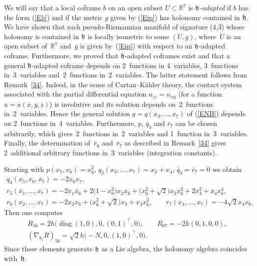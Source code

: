 \documentclass[11pt]{article}
\numberwithin{equation}{section}
\newcommand\fh{{\frak h}}
\newcommand\RR{{\mathbb R}}
\newcommand{\diag}{\operatorname{diag}}
\begin{document}
\begin{Remark} \label{R35} We will say that a local coframe $b$ on an open subset $U\subset \RR^7$ is {\it $\fh$-adapted} if $b$ has the form (\ref{Eb}) and if the metric $g$ given by (\ref{Eip}) has holonomy contained in $\fh$. We have shown that each pseudo-Riemannian manifold of signature (4,3) whose holonomy is contained in $\fh$ is locally isometric to some $(U,g)$, where~$U$ is an open subset of~$\RR^7$ and~$g$ is given by~(\ref{Eip}) with respect to an $\fh$-adapted coframe. Furthermore, we proved that $\fh$-adapted coframes exist and that a general $\fh$-adapted coframe depends on 2~functions in 4~variables, 3~functions in~3~variables and~2~functions in~2~variables. The latter statement follows from Remark~\ref{34}. Indeed, in the sense of Cartan--K\"ahler theory, the contact system associated with the partial differential equation $u_{zz}=u_{xy}$ (for a function $u=u(x,y,z)$) is involutive and its solution depends on~2~functions in~2~variables. Hence the general solution $q=q(x_3,\dots,x_7)$ of (\ref{ENB}) depends on 2~functions in~4~variables. Furthermore, $p$, $\bar q_3$ and $\bar r_7$ can be chosen arbitrarily, which gives~2~functions in~2~variables and 1~function in~3~variables. Finally, the determination of~$\bar r_6$ and~$\bar r_7$ as described in Remark~\ref{34} gives 2~additional arbitrary functions in~3~variables (integration constants).
\end{Remark}

\begin{Example} Starting with $p(x_5,x_6)=x_6^2$, $q_2(x_3,\dots, x_7)=x_3+x_4$, $\bar q_3=\bar r_7=0$ we obtain
\begin{gather*}
q_3(x_5,x_6,x_7) = -2x_6 x_7 ,\\
r_5(x_1,\dots, x_7) = -2x_1 x_6 +2 \big(1-x_6^2\big) x_2 x_6 +\big(x_6^2 +\sqrt2\big)x_3 x_6^2 +2x_4^2 +x_4 x_6^4,\\
r_6(x_2,\dots, x_7) = -2x_2 x_6 +\big(x_6^2 +\sqrt2\big)x_3 +x_4 x_6^2,\qquad
r_7(x_4,\dots, x_7) = -4\sqrt 2x_4 x_6 .
\end{gather*}
Then one computes
\begin{gather*}R_{56}=2h\big(\diag(1,0),0,(0,1)^\top,0\big), \qquad R_{67}=-2h(0,1,0,0), \\ (\nabla_{b_5} R)_{56}=\sqrt2 h\big({-}N,0,(1,0)^\top,0\big).\end{gather*}
Since these elements generate $\fh$ as a Lie algebra, the holonomy algebra coincides with~$\fh$.
\end{Example}
\end{document}
